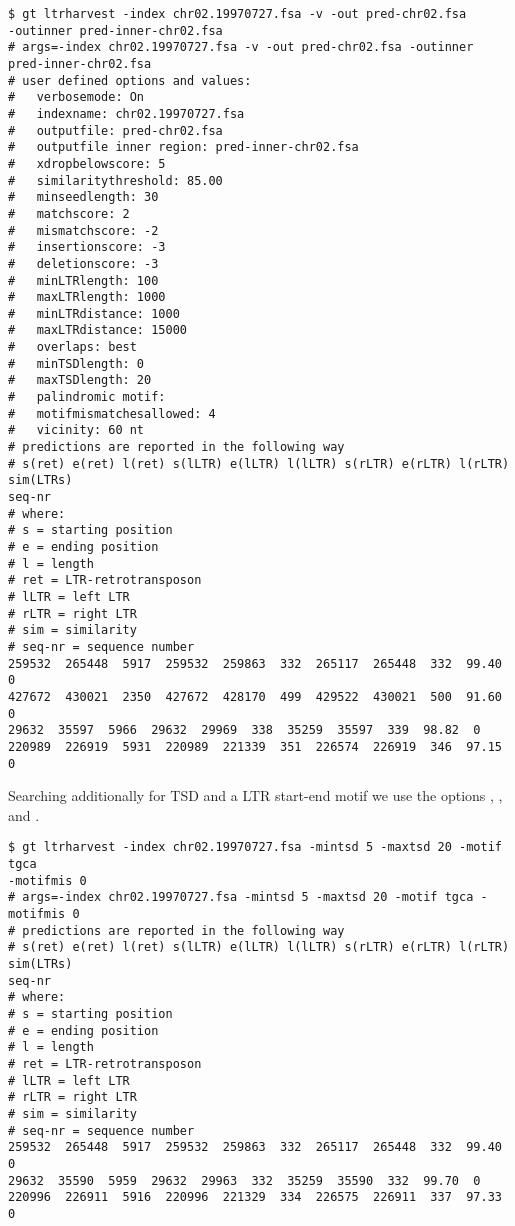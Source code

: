 \documentclass[12pt,titlepage]{article}
\begin{document}
\begin{footnotesize}
\begin{verbatim}
$ gt ltrharvest -index chr02.19970727.fsa -v -out pred-chr02.fsa
-outinner pred-inner-chr02.fsa
# args=-index chr02.19970727.fsa -v -out pred-chr02.fsa -outinner
pred-inner-chr02.fsa
# user defined options and values:
#   verbosemode: On
#   indexname: chr02.19970727.fsa
#   outputfile: pred-chr02.fsa
#   outputfile inner region: pred-inner-chr02.fsa
#   xdropbelowscore: 5
#   similaritythreshold: 85.00
#   minseedlength: 30
#   matchscore: 2
#   mismatchscore: -2
#   insertionscore: -3
#   deletionscore: -3
#   minLTRlength: 100
#   maxLTRlength: 1000
#   minLTRdistance: 1000
#   maxLTRdistance: 15000
#   overlaps: best
#   minTSDlength: 0
#   maxTSDlength: 20
#   palindromic motif:
#   motifmismatchesallowed: 4
#   vicinity: 60 nt
# predictions are reported in the following way
# s(ret) e(ret) l(ret) s(lLTR) e(lLTR) l(lLTR) s(rLTR) e(rLTR) l(rLTR) sim(LTRs)
seq-nr
# where:
# s = starting position
# e = ending position
# l = length
# ret = LTR-retrotransposon
# lLTR = left LTR
# rLTR = right LTR
# sim = similarity
# seq-nr = sequence number
259532  265448  5917  259532  259863  332  265117  265448  332  99.40  0
427672  430021  2350  427672  428170  499  429522  430021  500  91.60  0
29632  35597  5966  29632  29969  338  35259  35597  339  98.82  0
220989  226919  5931  220989  221339  351  226574  226919  346  97.15  0
\end{verbatim}
\end{footnotesize}

Searching additionally for TSD and a LTR start-end motif we use
the options , ,  and
.

\begin{footnotesize}
\begin{verbatim}
$ gt ltrharvest -index chr02.19970727.fsa -mintsd 5 -maxtsd 20 -motif tgca
-motifmis 0
# args=-index chr02.19970727.fsa -mintsd 5 -maxtsd 20 -motif tgca -motifmis 0
# predictions are reported in the following way
# s(ret) e(ret) l(ret) s(lLTR) e(lLTR) l(lLTR) s(rLTR) e(rLTR) l(rLTR) sim(LTRs)
seq-nr
# where:
# s = starting position
# e = ending position
# l = length
# ret = LTR-retrotransposon
# lLTR = left LTR
# rLTR = right LTR
# sim = similarity
# seq-nr = sequence number
259532  265448  5917  259532  259863  332  265117  265448  332  99.40  0
29632  35590  5959  29632  29963  332  35259  35590  332  99.70  0
220996  226911  5916  220996  221329  334  226575  226911  337  97.33  0
\end{verbatim}
\end{footnotesize}
\end{document}
